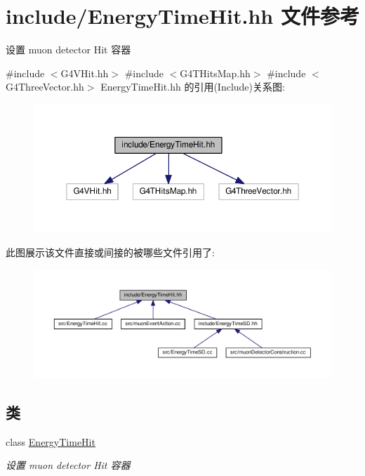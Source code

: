 \hypertarget{EnergyTimeHit_8hh}{}\section{include/\+Energy\+Time\+Hit.hh 文件参考}
\label{EnergyTimeHit_8hh}


设置 muon detector Hit 容器  


{\ttfamily \#include $<$G4\+V\+Hit.\+hh$>$}\newline
{\ttfamily \#include $<$G4\+T\+Hits\+Map.\+hh$>$}\newline
{\ttfamily \#include $<$G4\+Three\+Vector.\+hh$>$}\newline
Energy\+Time\+Hit.\+hh 的引用(Include)关系图\+:\nopagebreak
\begin{figure}[H]
\begin{center}
\leavevmode
\includegraphics[width=350pt]{EnergyTimeHit_8hh__incl}
\end{center}
\end{figure}
此图展示该文件直接或间接的被哪些文件引用了\+:\nopagebreak
\begin{figure}[H]
\begin{center}
\leavevmode
\includegraphics[width=350pt]{EnergyTimeHit_8hh__dep__incl}
\end{center}
\end{figure}
\subsection*{类}
\begin{DoxyCompactItemize}
\item 
class \hyperlink{classEnergyTimeHit}{Energy\+Time\+Hit}
\begin{DoxyCompactList}\small\item\em 设置 muon detector Hit 容器 \end{DoxyCompactList}\end{DoxyCompactItemize}
